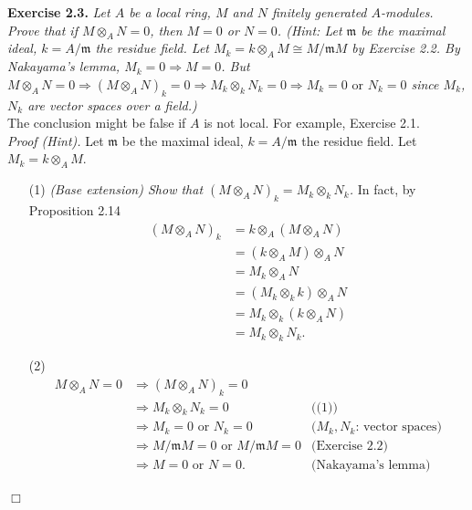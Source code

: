 \documentclass{article}
\begin{document}



\textbf{Exercise 2.3.}
\emph{Let $A$ be a local ring, $M$ and $N$ finitely generated $A$-modules.
Prove that if $M \otimes_{A} N = 0$, then $M = 0$ or $N = 0$.
(Hint: Let $\mathfrak{m}$ be the maximal ideal,
$k = A/\mathfrak{m}$ the residue field.
Let $M_k = k \otimes_{A} M \cong M/\mathfrak{m}M$ by Exercise 2.2.
By Nakayama's lemma, $M_k = 0 \Longrightarrow M = 0$.
But
$M \otimes_{A} N = 0
\Longrightarrow
(M \otimes_{A} N)_k = 0
\Longrightarrow
M_k \otimes_k N_k = 0
\Longrightarrow
M_k = 0 \text{ or } N_k = 0$
since $M_k$, $N_k$ are vector spaces over a field.)} \\

The conclusion might be false if $A$ is not local. For example, Exercise 2.1. \\

\emph{Proof (Hint).}
Let $\mathfrak{m}$ be the maximal ideal,
$k = A/\mathfrak{m}$ the residue field.
Let $M_k = k \otimes_{A} M$.
\begin{enumerate}
\item[(1)]
\emph{(Base extension) Show that
$(M \otimes_{A} N)_k = M_k \otimes_{k} N_k$.}
In fact, by Proposition 2.14
\begin{align*}
(M \otimes_{A} N)_k
&= k \otimes_{A} (M \otimes_{A} N) \\
&= (k \otimes_{A} M) \otimes_{A} N \\
&= M_k \otimes_{A} N \\
&= (M_k \otimes_{k} k) \otimes_{A} N \\
&= M_k \otimes_{k} (k \otimes_{A} N) \\
&= M_k \otimes_{k} N_k.
\end{align*}
\item[(2)]
\begin{align*}
M \otimes_{A} N = 0
&\Longrightarrow
(M \otimes_{A} N)_k = 0 \\
&\Longrightarrow
M_k \otimes_k N_k = 0
  &\text{((1))} \\
&\Longrightarrow
M_k = 0 \text{ or } N_k = 0
  &\text{($M_k, N_k$: vector spaces)} \\
&\Longrightarrow
M/\mathfrak{m}M = 0 \text{ or } M/\mathfrak{m}M = 0
  &\text{(Exercise 2.2)} \\
&\Longrightarrow
M = 0 \text{ or } N = 0.
  &\text{(Nakayama's lemma)} \\
\end{align*}
\end{enumerate}
$\Box$ \\\\



\end{document}
